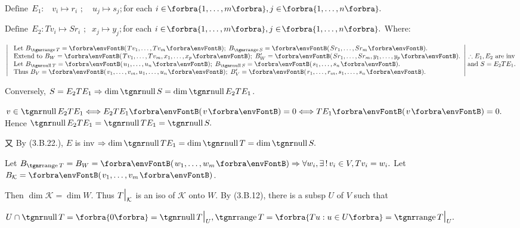 \par\quad
$\text{Define}\;\,E_1:\,\,\,\,\, v_i\mapsto r_i\,\,;\quad u_j\mapsto s_j;$\quad for each $i\in\!\Bra{1,\dots,m},j\in\!\Bra{1,\dots,n}.$\par\quad
$\text{Define}\;\,E_2:Tv_i\mapsto Sr_i\,\,;\;\;x_j\mapsto y_j;$\quad for each $i\in\!\Bra{1,\dots,m},j\in\!\Bra{1,\dots,n}.$
Where:\par\vspace{6pt}\quad
$\MathLeftrightMid{l}{$
	Let $B_{\range T}=\Par{Tv_1,\dots,Tv_m};\;B_{\range S}=\Par{Sr_1,\dots,Sr_m}.\\ $
	Extend to $B_W=\Par{Tv_1,\dots,Tv_m,x_1,\dots,x_p};\;B_W'=\Par{Sr_1,\dots,Sr_m,y_1,\dots,y_p}.\\ $
	Let $B_{\null T}=\Par{u_1,\dots,u_n};\;B_{\null S}=\Par{s_1,\dots,s_n}.\\ $
	Thus $B_V=\Par{v_1,\dots,v_m,u_1,\dots,u_n};\;B_V'=\Par{r_1,\dots,r_m,s_1,\dots,s_n}.}\hMath{c}{}{}{\therefore E_1,E_2$ are inv$ \\ $and $S=E_2 TE_1.}$\par\vspace{6pt}\quad
Conversely, \;$S=E_2 TE_1\Rightarrow\dim\null S=\dim\null E_2 TE_1$.\par\quad
$v\in\null E_2 TE_1\Longleftrightarrow E_2 TE_1\Par{v}=0\Longleftrightarrow TE_1\Par{v}=0.$ Hence $\null E_2 TE_1=\null TE_1=\null S.$\par\quad
又 By (3.B.22.\COROLLARY), $E$ is inv $\Rightarrow\dim\null TE_1=\dim\null T=\dim\null S.$\PfEnd
\SepLine

\par\quad
Let $B_{\range T}=B_W=\Par{w_1,\dots,w_m}\Rightarrow\forall w_i,\exists\,!\,v_i\in V,Tv_i=w_i.$ Let $B_{\mathcal{K}}=\Par{v_1,\dots,v_m}$.\par\quad
Then $\dim\mathcal{K}=\dim W.$ Thus $T\text{\Large|}_{\mathcal{K}}$ is an iso of ${\mathcal{K}}$ onto $W.$\PfEnd\vspace{6pt}\quad
\Or By (3.B.12), there is a subsp $U$ of $V$ such that\par\quad
$U\cap \null T=\zeroSubs=\null T\mmid_U,\range T=\Bra{Tu:u\in U}=\range T\mmid_U.$\PfEnd
\SepLine
\pagebreak

